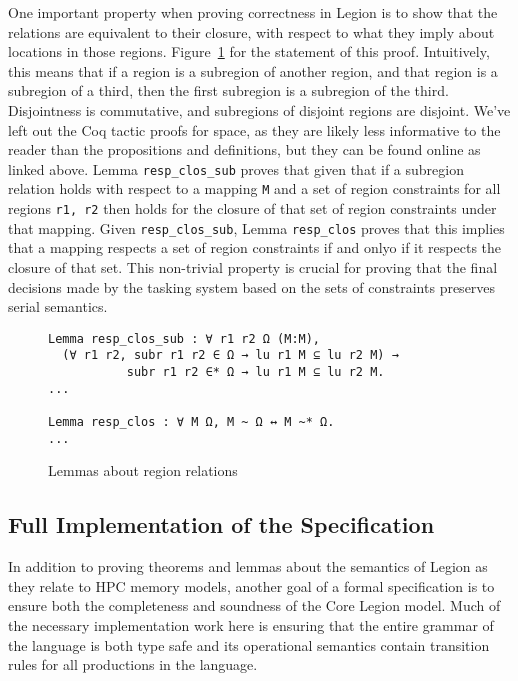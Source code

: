 \documentclass[sigconf]{acmart}
\begin{document}
One important property when proving correctness in Legion is to show that the
relations are equivalent to their closure, with respect to what they imply
about locations in those regions.  Figure~\ref{regionrelproof} for the
statement of this proof. Intuitively, this means that if a region is a
subregion of another region, and that region is a subregion of a third, then
the first subregion is a subregion of the third. Disjointness is commutative, 
and subregions of disjoint regions are disjoint. We've left out the Coq tactic
proofs for space, as they are likely less informative to the reader than the
propositions and definitions, but they can be found online as linked above. 
Lemma \texttt{resp\_clos\_sub} proves that given that if a subregion relation
holds with respect to a mapping \texttt{M} and a set of region constraints
 for all regions \texttt{r1, r2} then holds for the closure of that
set of region constraints under that mapping. Given \texttt{resp\_clos\_sub}, 
Lemma \texttt{resp\_clos} proves that this implies that a mapping respects
a set of region constraints if and onlyo if it respects the closure of that
set. This non-trivial property is crucial for proving that the final decisions 
made by the tasking system based on the sets of constraints preserves 
serial semantics. 

\begin{figure}
\centering
\begin{BVerbatim}
Lemma resp_clos_sub : ∀ r1 r2 Ω (M:M), 
  (∀ r1 r2, subr r1 r2 ∈ Ω → lu r1 M ⊆ lu r2 M) → 
           subr r1 r2 ∈* Ω → lu r1 M ⊆ lu r2 M.
...

Lemma resp_clos : ∀ M Ω, M ~ Ω ↔ M ~* Ω.
...
\end{BVerbatim}
\caption{Lemmas about region relations}
\label{regionrelproof}
\end{figure}

\subsection{Full Implementation of the Specification}
In addition to proving theorems and lemmas about the semantics of Legion as they
relate to HPC memory models, another goal of a formal specification is to ensure
both the completeness and soundness of the Core Legion model. Much of the
necessary implementation work here is ensuring that the entire grammar of the
language is both type safe and its operational semantics contain transition
rules for all productions in the language.
\end{document}
